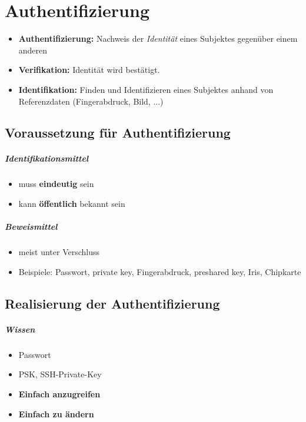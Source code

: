 \chapter{Authentifizierung}
\begin{itemize}
	\item \textbf{Authentifizierung:} Nachweis der \textit{Identität} eines Subjektes gegenüber einem anderen
	\item \textbf{Verifikation:} Identität wird bestätigt.
	\item \textbf{Identifikation:} Finden und Identifizieren eines Subjektes anhand von Referenzdaten (Fingerabdruck, Bild, ...)
\end{itemize}

\section{Voraussetzung für Authentifizierung}
\paragraph{Identifikationsmittel}
\begin{itemize}
	\item muss \textbf{eindeutig} sein
	\item kann \textbf{öffentlich} bekannt sein
\end{itemize}

\paragraph{Beweismittel}
\begin{itemize}
	\item meist unter Verschluss
	\item Beispiele: Passwort, private key, Fingerabdruck, preshared key, Iris, Chipkarte
\end{itemize}

\section{Realisierung der Authentifizierung}

\paragraph{Wissen}
\begin{itemize}
	\item Passwort
	\item PSK, SSH-Private-Key
	\item \textbf{Einfach anzugreifen}
	\item \textbf{Einfach zu ändern}
\end{itemize}

